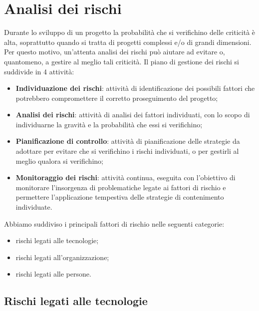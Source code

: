 \section{Analisi dei rischi}
Durante lo sviluppo di un progetto la probabilità che si verifichino delle criticità è alta, 
soprattutto quando si tratta di progetti complessi e/o di grandi dimensioni. Per questo motivo,
un'attenta analisi dei rischi può aiutare ad evitare o, quantomeno, a gestire al meglio tali criticità.
Il piano di gestione dei rischi si suddivide in 4 attività:
\begin{itemize}
    \item \textbf{Individuazione dei rischi}: attività di identificazione dei possibili fattori che potrebbero compromettere il corretto proseguimento del progetto;
    \item \textbf{Analisi dei rischi}: attività di analisi dei fattori individuati, con lo scopo di individuarne la gravità e la probabilità che essi si verifichino;
    \item \textbf{Pianificazione di controllo}: attività di pianificazione delle strategie da adottare per evitare che si verifichino i rischi individuati, o per gestirli al meglio qualora si verifichino;
    \item \textbf{Monitoraggio dei rischi}: attività continua, eseguita con l'obiettivo di monitorare l'insorgenza di problematiche legate ai fattori di rischio e permettere l'applicazione tempestiva delle strategie di contenimento individuate.
\end{itemize}
Abbiamo suddiviso i principali fattori di rischio nelle seguenti categorie:
\begin{itemize}
    \item rischi legati alle tecnologie;
    \item rischi legati all'organizzazione;
    \item rischi legati alle persone.
\end{itemize}

\subsection{Rischi legati alle tecnologie}


